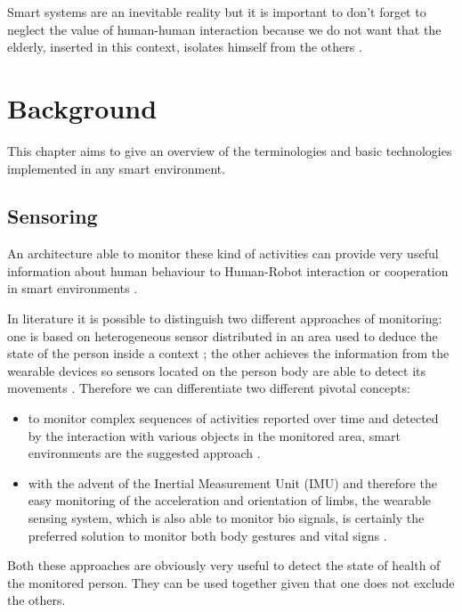 \documentclass{thesisreport}
\begin{document}
 Smart systems are an inevitable reality but it is important to don't forget to neglect the value of human-human interaction because we do not want that the elderly, inserted in this context, isolates himself from the others \cite{phdthesis}.
 

 \chapter{Background}
This chapter aims to give an overview of the terminologies and basic technologies implemented in any smart environment. 

 \section{Sensoring}
 An architecture able to monitor these kind of activities can provide very useful information about human behaviour to Human-Robot interaction or cooperation in smart environments \cite{bruno2014public}.  
 
 In literature it is possible to distinguish two different approaches of monitoring: one is based on heterogeneous sensor distributed in an area used to deduce the state of the person inside a context \cite{aggarwal2011human}; the other achieves the information from the wearable devices so sensors located on the person body are able to detect its movements  \cite{bao2004activity}. 
 Therefore we can differentiate two different pivotal concepts:
 \begin{itemize}
    \item to monitor complex sequences of activities reported over time and detected by the interaction with various objects in the monitored area, smart environments are the suggested approach \cite{scalmato2012describing}.
    \item with the advent of the Inertial Measurement Unit (IMU) and therefore the easy monitoring of the acceleration and orientation of limbs, the wearable sensing system, which is also able to monitor bio signals, is certainly the preferred solution to monitor both body gestures and vital signs \cite{bruno2013analysis}.
\end{itemize}
 
Both these approaches are obviously very useful to detect the state of health of the monitored person. They can be used together given that one does not exclude the others. 
\end{document}
